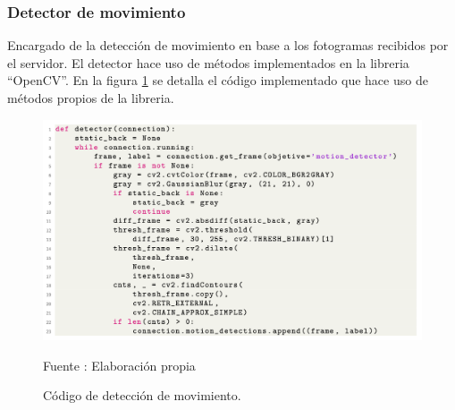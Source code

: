\subsubsection{Detector de movimiento}
Encargado de la detección de movimiento en base a los fotogramas recibidos por el servidor. El detector hace uso de métodos implementados en la libreria ``OpenCV''. En la figura \ref{fig:motion_detector} se detalla el código implementado que hace uso de métodos propios de la libreria.\\

\begin{figure}[H]
    \begin{center}
        \includegraphics[width=16cm]{img/capitulo_5/motion_detector.png}
    \end{center}
    \begin{center}
        \caption{Código de detección de movimiento.}
        Fuente : Elaboración propia
        \label{fig:motion_detector}
    \end{center}
\end{figure}

